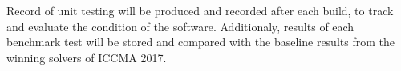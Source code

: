 Record of unit testing will be produced and recorded after each build, to track and evaluate the condition of the software. Additionaly, results of each benchmark test will be stored and compared with the baseline results from the winning solvers of ICCMA 2017.